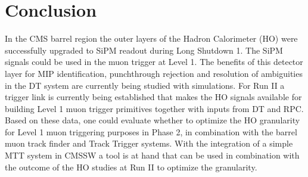 \section{Conclusion}
	In the CMS barrel region the outer layers of the Hadron Calorimeter (HO) were successfully upgraded to SiPM readout during Long Shutdown 1. 
	The SiPM signals could be used in the muon trigger at Level 1.
	The benefits of this detector layer for MIP identification, punchthrough rejection and resolution of ambiguities in the DT system are
	currently being studied with simulations.
	For Run II a trigger link is currently being established that makes the HO signals available for building Level 1 muon trigger primitives together with inputs from DT and RPC. Based on these data,
	one could evaluate whether to optimize the HO granularity for Level 1 muon triggering purposes in Phase 2, in combination with the barrel muon track finder and Track Trigger systems.
	With the integration of a simple MTT system in CMSSW a tool is at hand that can be used in combination with the outcome of the HO studies at Run II to optimize the granularity.